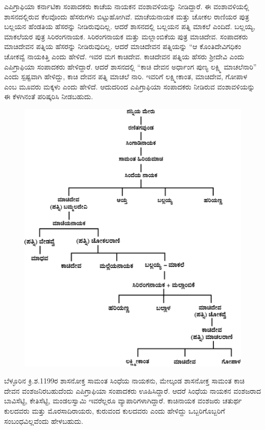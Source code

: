 ಎಪಿಗ್ರಾಫಿಯಾ ಕರ್ನಾಟಿಕಾ ಸಂಪಾದಕರು ಕಾಚೆಯ ನಾಯಕನ ವಂಶಾವಳಿಯನ್ನು ನೀಡಿದ್ದಾರೆ. ಈ ವಂಶಾವಳಿ\-ಯಲ್ಲಿ ಶಾಸನದಲ್ಲಿರುವ ಕೆಲವೊಂದು ಹೆಸರುಗಳು ಬಿಟ್ಟುಹೋಗಿವೆ. ಮಾಚೆಯನಾಯಕ ಮತ್ತು ಚೋಕಲ ರಾಣಿಯರ ಪುತ್ರ ಬಲ್ಲಯನ ಹೆಂಡತಿಯ ಹೆಸರನ್ನು ನೀಡಿರುವುದಿಲ್ಲ. ಆದರೆ ಶಾಸನದಲ್ಲಿ ಬಲ್ಲಯನ ಪತ್ನಿ ಮಾಕಲೆ ಎಂದಿದೆ. ಬಲ್ಲಯ್ಯ, ಮಾಕಲೆಯರ ಪುತ್ರ ಸಿರಿರಂಗನಾಯಕ. ಸಿರಿರಂಗನಾಯಕ ಮತ್ತು ಮಲ್ಲಾಂಬಿಕೆಯ ಪುತ್ರ ಮಾಚಿದೇವ. ಸಂಪಾದಕರು ಮಾಚಿದೇವನ ಪತ್ನಿಯ ಹೆಸರನ್ನು ನೀಡಿರುವುದಿಲ್ಲ. ಆದರೆ ಮಾಚಿದೇವನ ಪತ್ನಿಯನ್ನು “ಆ ಕೊಂತಿದೇವಿಗಧಿಕಂ ಚೋಕವ್ವೆ ನಾಯಕಿತ್ತಿ ಎಂದು ಹೇಳಿದೆ. ಇವರ ಮಗ ಕಾಚಿದೇವ. ಕಾಚಿದೇವನ ಪತ್ನಿಯ ಹೆಸರು ಶ‍್ರೀದೇವಿ ಎಂದು ಎಪಿಗ್ರಾಫಿಯಾ ಸಂಪಾದಕರು ಹೇಳಿದ್ದಾರೆ. ಆದರೆ ಶಾಸನದಲ್ಲಿ “ಕಾಚಿ ದೇವನ ಅರ್ಧಾಂಗ ಪುಣ್ಯ ಲಕ್ಷ್ಮಿ ಮಾಚಲೆನಾರಿ” ಎಂದು ಸ್ಪಷ್ಟವಾಗಿ ಹೇಳಿದ್ದು, ಕಾಚಿ ದೇವನ ಪತ್ನಿ ಮಾಚಲೆ ನಾರಿ. ಇವರಿಗೆ ಲಕ್ಷ್ಮೀಕಾಂತ, ಮಾಚಿದೇವ, ಗೋಪಾಳ ಎಂಬ ಮೂವರು ಮಕ್ಕಳು ಎಂದು ಹೇಳಿದೆ. ಆದುದರಿಂದ ಎಪಿಗ್ರಾಫಿಯಾ ಸಂಪಾದಕರು ನೀಡಿರುವ ವಂಶಾವಳಿಯನ್ನು ಈ ಕೆಳಗಿನಂತೆ ಪರಿಷ್ಕರಿಸಿ ನೀಡಬಹುದು.

\begin{figure}[H]
\includegraphics[scale=1.05]{images/chap3/chap3fig7.jpeg}
\end{figure}

ಬೆಳ್ಳೂರಿನ ಕ್ರಿ.ಶ.1199ರ ಶಾಸನೋಕ್ತ ಸಾಮಂತ ಸಿಂಧೆಯ ನಾಯಕನು, ಮೇಲ್ಕಂಡ ಶಾಸನೋಕ್ತ ಸಾಮಂತ ಕಾಚಿ ದೇವನ ವಂಶಜನಿರಬಹುದೆಂದು ಎಪಿಗ್ರಾಫಿಯಾ ಸಂಪಾದಕರು ಊಹಿಸಿದ್ದಾರೆ. ಆದರೆ ಸಿಂಧೆಯ ನಾಯಕನ ವಂಶಜರಾದ ಬಾವಿಸೆಟ್ಟಿ, ಕೇತಿಸೆಟ್ಟಿ, ಮಂಡಲಸ್ವಾಮಿ ಇವರೆಲ್ಲರೂ ವ್ಯಾಪಾರಿಗಳಾಗಿದ್ದಾರೆ. ಕಾಚಿನಾಯಕ ವಂಶಜರು ಚತುರ್ಥ ಕುಲದವರು ಮತ್ತು ಮೊರಸಾದಿರಾಯರು, ಕುರುವಂದ ಕುಲದವರು ಎಂದು ಹೇಳಿದ್ದು ಒಬ್ಬರಿಗೊಬ್ಬರಿಗೆ ಸಂಬಂಧ\-ವಿಲ್ಲವೆಂದು ಹೇಳಬಹುದು.

